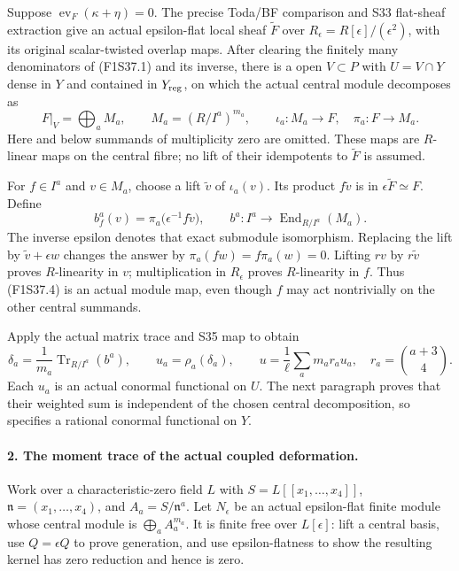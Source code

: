 Suppose $\operatorname{ev}_F(\kappa+\eta)=0$.
The precise Toda/BF comparison and S33
flat-sheaf extraction give an actual
epsilon-flat local sheaf $\widetilde F$
over $R_\epsilon=R[\epsilon]/(\epsilon^2)$,
with its original scalar-twisted overlap maps.
After clearing the finitely many denominators
of (F1S37.1) and its inverse, there is a
open $V\subset P$ with $U=V\cap Y$ dense
in $Y$ and contained in $Y_{\rm reg}$,
on which the actual central module decomposes as
\[
 F|_V=\bigoplus_a M_a,\qquad
 M_a=(R/I^a)^{m_a},\qquad
 \iota_a:M_a\longrightarrow F,\quad
 \pi_a:F\longrightarrow M_a.
 \tag{F1S37.3}
\]
Here and below summands of multiplicity zero
are omitted. These maps are $R$-linear maps
on the central fibre; no lift of their
idempotents to $\widetilde F$ is assumed.

For $f\in I^a$ and $v\in M_a$, choose a
lift $\widetilde v$ of $\iota_a(v)$.
Its product $f\widetilde v$ is in
$\epsilon\widetilde F\simeq F$. Define
\[
 b_f^a(v)=\pi_a\bigl(\epsilon^{-1}f\widetilde v\bigr),
 \qquad
 b^a:I^a\longrightarrow\operatorname{End}_{R/I^a}(M_a).
 \tag{F1S37.4}
\]
The inverse epsilon denotes that exact
submodule isomorphism. Replacing the lift
by $\widetilde v+\epsilon w$ changes the
answer by $\pi_a(fw)=f\pi_a(w)=0$.
Lifting $rv$ by $r\widetilde v$ proves
$R$-linearity in $v$; multiplication in
$R_\epsilon$ proves $R$-linearity in $f$.
Thus (F1S37.4) is an actual module map,
even though $f$ may act nontrivially on
the other central summands.

Apply the actual matrix trace and S35 map
to obtain
\[
 \delta_a=\frac1{m_a}\operatorname{Tr}_{R/I^a}(b^a),
 \qquad u_a=\rho_a(\delta_a),\qquad
 u=\frac1\ell\sum_a m_a r_a u_a,
 \quad r_a=\binom{a+3}{4}.
 \tag{F1S37.5}
\]
Each $u_a$ is an actual conormal functional
on $U$. The next paragraph proves that
their weighted sum is independent of the
chosen central decomposition, so specifies
a rational conormal functional on $Y$.

\paragraph{2. The moment trace of the actual coupled deformation.}
Work over a characteristic-zero field $L$
with $S=L[[x_1,\ldots,x_4]]$,
$\mathfrak n=(x_1,\ldots,x_4)$, and
$A_a=S/\mathfrak n^a$. Let $N_\epsilon$
be an actual epsilon-flat finite module
whose central module is
$\bigoplus_a A_a^{m_a}$.
It is finite free over $L[\epsilon]$:
lift a central basis, use $Q=\epsilon Q$
to prove generation, and use epsilon-flatness
to show the resulting kernel has zero
reduction and hence is zero.

